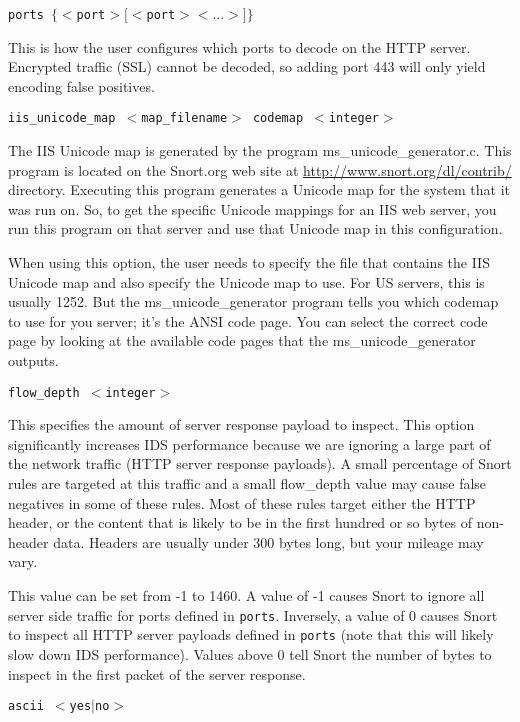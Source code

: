 \documentclass[english]{report}
\newcounter{slistnum}
\newenvironment{slist}
{ \begin{list}{ {\bf \arabic{slistnum}.} }{\usecounter{slistnum} } }
{ \end{list} }
\begin{document}
\begin{slist}
\item \texttt{ports $\{ <$port$> [<$port$> <...>] \}$}

This is how the user configures which ports to decode on the HTTP server.
Encrypted traffic (SSL) cannot be decoded, so adding port 443 will only
yield encoding false positives.

\item \texttt{iis\_unicode\_map $<$map\_filename$>$ codemap $<$integer$>$}

The IIS Unicode map is generated by the program ms\_unicode\_generator.c.  This
program is located on the Snort.org web site at \url{http://www.snort.org/dl/contrib/}
directory.  Executing this program
generates a Unicode map for the system that it was run on.  So, to get the
specific Unicode mappings for an IIS web server, you run this program on that
server and use that Unicode map in this configuration.

When using this option, the user needs to specify the file that contains the
IIS Unicode map and also specify the Unicode map to use.  For US servers, this
is usually 1252.  But the ms\_unicode\_generator program tells you which codemap
to use for you server; it's the ANSI code page.  You can select the correct code
page by looking at the available code pages that the ms\_unicode\_generator
outputs.

\item \texttt{flow\_depth $<$integer$>$}

This specifies the amount of server response payload to inspect.  This option
significantly increases IDS performance because we are ignoring a large part of
the network traffic (HTTP server response payloads).  A small percentage of
Snort rules are targeted at this traffic and a small flow\_depth value may
cause false negatives in some of these rules.  Most of these rules target
either the HTTP header, or the content that is likely to be in the first
hundred or so bytes of non-header data.  Headers are usually under 300 bytes
long, but your mileage may vary.

This value can be set from -1 to 1460. A value of -1 causes Snort to
ignore all server side traffic for ports defined in \texttt{ports}.
Inversely, a value of 0 causes Snort to inspect all HTTP server payloads
defined in \texttt{ports} (note that this will likely slow down IDS
performance).  Values above 0 tell Snort the number of bytes to inspect
in the first packet of the server response.

\item \texttt{ascii $<$yes$|$no$>$}


\end{slist}
\end{document}
